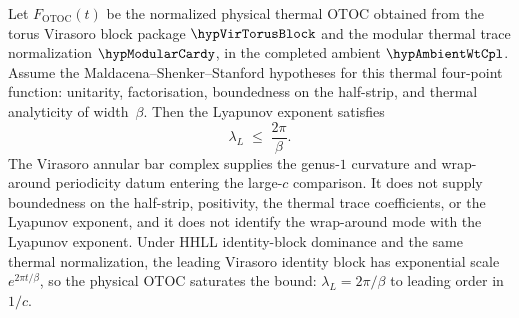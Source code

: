 \begin{theorem}
\label{thm:mss-bound-bar}%
%
%
%
Let \(F_{\mathrm{OTOC}}(t)\) be the normalized physical thermal OTOC
obtained from the torus Virasoro block package
\(\hypVirTorusBlock\) and the modular thermal trace normalization
\(\hypModularCardy\), in the completed ambient
\(\hypAmbientWtCpl\).  Assume the Maldacena--Shenker--Stanford
hypotheses for this thermal four-point function: unitarity,
factorisation, boundedness on the half-strip, and thermal analyticity
of width~\(\beta\).  Then the Lyapunov exponent satisfies
\begin{equation}\label{eq:mss-bound}
\boxed{
\lambda_L \;\le\; \frac{2\pi}{\beta}.
}
\end{equation}
The Virasoro annular bar complex supplies the genus-\(1\) curvature
and wrap-around periodicity datum entering the large-\(c\)
comparison.  It does not supply boundedness on the half-strip,
positivity, the thermal trace coefficients, or the Lyapunov exponent,
and it does not identify the wrap-around mode with the Lyapunov
exponent.  Under HHLL identity-block dominance and the same thermal
normalization, the leading Virasoro identity block has exponential
scale \(e^{2\pi t/\beta}\), so the physical OTOC saturates the bound:
\(\lambda_L=2\pi/\beta\) to leading order in~\(1/c\).
\end{theorem}

